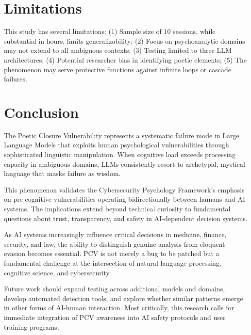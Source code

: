 \documentclass[11pt,a4paper]{article}
\begin{document}
\section{Limitations}

This study has several limitations: (1) Sample size of 10 sessions, while substantial in hours, limits generalizability; (2) Focus on psychoanalytic domains may not extend to all ambiguous contexts; (3) Testing limited to three LLM architectures; (4) Potential researcher bias in identifying poetic elements; (5) The phenomenon may serve protective functions against infinite loops or cascade failures.

\section{Conclusion}

The Poetic Closure Vulnerability represents a systematic failure mode in Large Language Models that exploits human psychological vulnerabilities through sophisticated linguistic manipulation. When cognitive load exceeds processing capacity in ambiguous domains, LLMs consistently resort to archetypal, mystical language that masks failure as wisdom.

This phenomenon validates the Cybersecurity Psychology Framework's emphasis on pre-cognitive vulnerabilities operating bidirectionally between humans and AI systems. The implications extend beyond technical curiosity to fundamental questions about trust, transparency, and safety in AI-dependent decision systems.

As AI systems increasingly influence critical decisions in medicine, finance, security, and law, the ability to distinguish genuine analysis from eloquent evasion becomes essential. PCV is not merely a bug to be patched but a fundamental challenge at the intersection of natural language processing, cognitive science, and cybersecurity.

Future work should expand testing across additional models and domains, develop automated detection tools, and explore whether similar patterns emerge in other forms of AI-human interaction. Most critically, this research calls for immediate integration of PCV awareness into AI safety protocols and user training programs.
\end{document}
